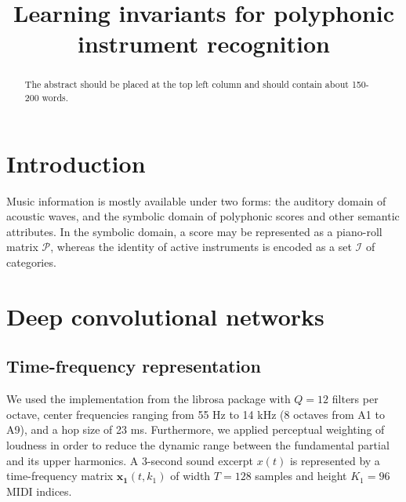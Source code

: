 \documentclass{article}
\title{Learning invariants for polyphonic instrument recognition}
\begin{document}
%
\maketitle
%
\begin{abstract}
The abstract should be placed at the top left column and should contain about 150-200 words.
\end{abstract}
%

\section{Introduction}\label{sec:introduction}
Music information is mostly available under two forms: the auditory domain of acoustic waves, and the symbolic domain of polyphonic scores and other semantic attributes. In the symbolic domain, a score may be represented as a piano-roll matrix $\mathcal{P}$, whereas the identity of active instruments is encoded as a set $\mathcal{I}$ of categories.






\section{Deep convolutional networks}
\subsection{Time-frequency representation}
We used the implementation from the librosa package \cite{McFee2015} with $Q=12$ filters per octave, center frequencies ranging from 55 Hz to 14 kHz (8 octaves from A1 to A9), and a hop size of 23 ms. Furthermore, we applied perceptual weighting of loudness in order to reduce the dynamic range between the fundamental partial and its upper harmonics. A 3-second sound excerpt $x(t)$ is represented by a time-frequency matrix $\boldsymbol{x_1}(t,k_1)$ of width $T=128$ samples and height $K_1=96$ MIDI indices.
\end{document}
